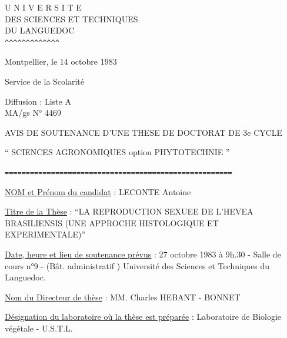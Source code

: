 

\noindent
\begin{minipage}[t]{.42\linewidth}
\centering
U N I V E R S I T E\\
DES SCIENCES ET TECHNIQUES\\
DU LANGUEDOC\\
\texttt{\textasciicircum\textasciicircum\textasciicircum\textasciicircum\textasciicircum\textasciicircum\textasciicircum\textasciicircum\textasciicircum\textasciicircum\textasciicircum\textasciicircum\textasciicircum}
\end{minipage}\hfill
\begin{minipage}[t]{.54\linewidth}
\raggedleft
\vspace*{.8\baselineskip}
Montpellier, le 14 octobre 1983
\end{minipage}

\medskip
Service de la Scolarité

Diffusion : Liste A\\
MA/gs \qquad N° 4469

\begin{center}
AVIS DE SOUTENANCE D'UNE THESE DE DOCTORAT DE 3e CYCLE

`` SCIENCES AGRONOMIQUES option PHYTOTECHNIE ''

\texttt{======================================================}
\end{center}

\uline{NOM et Prénom du candidat} : LECONTE Antoine

\uline{Titre de la Thèse} : ``LA REPRODUCTION SEXUEE DE L'HEVEA BRASILIENSIS
(UNE APPROCHE HISTOLOGIQUE ET EXPERIMENTALE)''

\uline{Date, heure et lieu de soutenance prévus} : 27 octobre 1983 à 9h.30 - Salle
de cours n°9 - (Bât. administratif ) Université des Sciences et Techniques du
Languedoc.

\uline{Nom du Directeur de thèse} : MM. Charles HEBANT - BONNET

\uline{Désignation du laboratoire où la thèse est préparée} : Laboratoire de
Biologie végétale - U.S.T.L.

\noindent\hspace*{.77\linewidth}%

